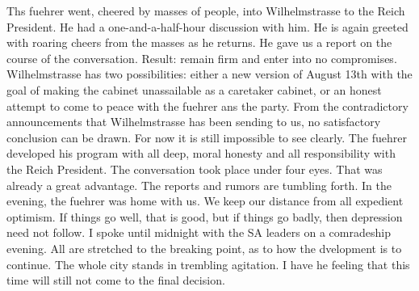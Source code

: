 
Ths fuehrer went, cheered by masses of people, into Wilhelmstrasse to the Reich President. He had a one-and-a-half-hour discussion with him. He is again greeted with roaring cheers from the masses as he returns. He gave us a report on the course of the conversation. Result: remain firm and enter into no compromises. Wilhelmstrasse has two possibilities: either a new version of August 13th with the goal of making the cabinet unassailable as a caretaker cabinet, or an honest attempt to come to peace with the fuehrer ans the party. From the contradictory announcements that Wilhelmstrasse has been sending to us, no satisfactory conclusion can be drawn. For now it is still impossible to see clearly. The fuehrer developed his program with all deep, moral honesty and all responsibility with the Reich President. The conversation took place under four eyes. That was already a great advantage. The reports and rumors are tumbling forth. In the evening, the fuehrer was home with us. We keep our distance from all expedient optimism. If things go well, that is good, but if things go badly, then depression need not follow. I spoke until midnight with the SA leaders on a comradeship evening. All are stretched to the breaking point, as to how the dvelopment is to continue. The whole city stands in trembling agitation. I have 
he feeling that this time will still not come to the final decision.
%